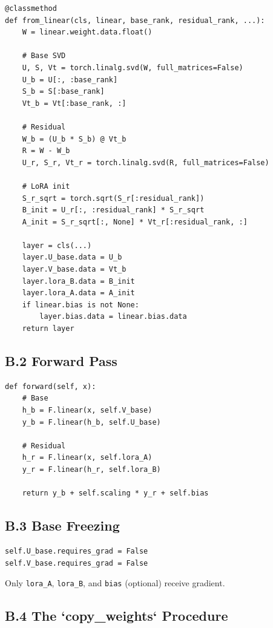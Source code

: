 \begin{lstlisting}
@classmethod
def from_linear(cls, linear, base_rank, residual_rank, ...):
    W = linear.weight.data.float()
    
    # Base SVD
    U, S, Vt = torch.linalg.svd(W, full_matrices=False)
    U_b = U[:, :base_rank]
    S_b = S[:base_rank]
    Vt_b = Vt[:base_rank, :]
    
    # Residual
    W_b = (U_b * S_b) @ Vt_b
    R = W - W_b
    U_r, S_r, Vt_r = torch.linalg.svd(R, full_matrices=False)
    
    # LoRA init
    S_r_sqrt = torch.sqrt(S_r[:residual_rank])
    B_init = U_r[:, :residual_rank] * S_r_sqrt
    A_init = S_r_sqrt[:, None] * Vt_r[:residual_rank, :]
    
    layer = cls(...)
    layer.U_base.data = U_b
    layer.V_base.data = Vt_b
    layer.lora_B.data = B_init
    layer.lora_A.data = A_init
    if linear.bias is not None:
        layer.bias.data = linear.bias.data
    return layer
\end{lstlisting}

\subsection{B.2 Forward Pass}

\begin{lstlisting}
def forward(self, x):
    # Base
    h_b = F.linear(x, self.V_base)
    y_b = F.linear(h_b, self.U_base)
    
    # Residual
    h_r = F.linear(x, self.lora_A)
    y_r = F.linear(h_r, self.lora_B)
    
    return y_b + self.scaling * y_r + self.bias
\end{lstlisting}

\subsection{B.3 Base Freezing}

\begin{lstlisting}
self.U_base.requires_grad = False
self.V_base.requires_grad = False
\end{lstlisting}

Only \texttt{lora\_A}, \texttt{lora\_B}, and \texttt{bias} (optional) receive gradient.

\subsection{B.4 The `copy\_weights` Procedure}

